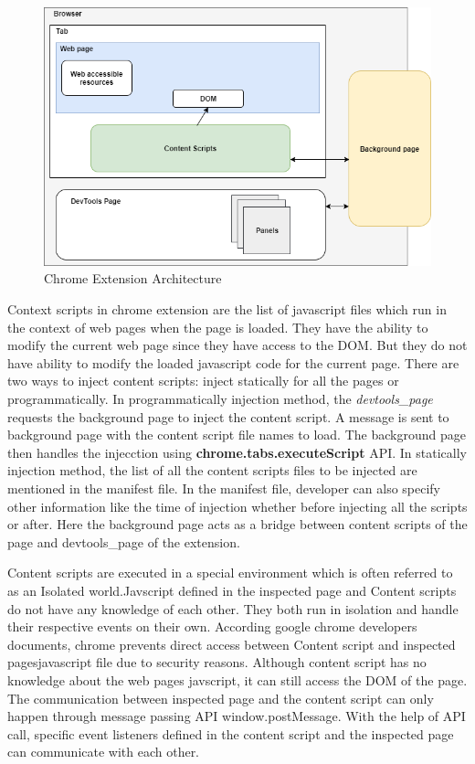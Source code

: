 \begin{figure}[!h]
	\centering
	\includegraphics[scale=0.5,trim=0 0 0 0]{images/chrome-extension-architecture.png}
	\caption{Chrome Extension Architecture}
	\label{fig:extension-architecture}
\end{figure}

Context scripts in chrome extension are the list of javascript files which run in the context of web pages when the page is loaded\cite{contentscripts}. They have the ability to modify the current web page since they have access to the DOM. But they do not have ability to modify the loaded javascript code for the current page. There are two ways to inject content scripts: inject statically for all the pages or programmatically. In programmatically injection method, the \textit{devtools\_page} requests the background page to inject the content script. A message is sent to background page with the content script file names to load. The background page then handles the injecction using \textbf{chrome.tabs.executeScript} API. In statically injection method, the list of all the content scripts files to be injected are mentioned in the manifest file. In the manifest file, developer can also specify other information like the time of injection whether before injecting all the scripts or after. Here the background page acts as a bridge between content scripts of the page and devtools\_page of the extension.

Content scripts are executed in a special environment which is often referred to as an Isolated world\cite{contentscripts}.Javscript defined in the inspected page and Content scripts do not have any knowledge of each other. They both run in isolation and handle their respective events on their own\cite{contentscripts}. According google chrome developers documents, chrome prevents direct access between Content script and inspected pages\textquotesingle javascript file due to security reasons. Although content script has no knowledge about the web page\textquotesingle s javscript, it  can still access the DOM of the page. The communication between inspected page and the content script can only happen through message passing API window.postMessage\cite{contentscripts}. With the help of API call, specific event listeners defined in the content script and the inspected page can communicate with each other.


